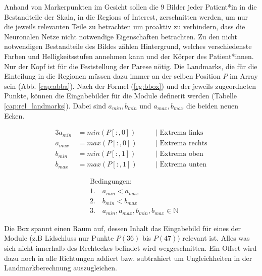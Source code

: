 Anhand von Markerpunkten im Gesicht sollen die 9 Bilder jeder Patient*in in die Bestandteile der Skala, in die Regions of Interest, zerschnitten werden, um nur die jeweils relevanten Teile zu betrachten um proaktiv zu verhindern, dass die Neuronalen Netze nicht notwendige Eigenschaften betrachten. Zu den nicht notwendigen Bestandteile des Bildes zählen Hintergrund, welches verschiedenste Farben und Helligkeitsstufen annehmen kann und der Körper des Patient*innen. Nur der Kopf ist für die Feststellung der Parese nötig. Die Landmarks, die für die Einteilung in die Regionen müssen dazu immer an der selben Position $P$ im Array sein (Abb. \ref{cap:abba}). Nach der Formel (\ref{eg:bbox}) und der jeweils zugeordneten Punkte, können die Eingabebilder für die Module definerit werden (Tabelle \ref{cap:rel_landmarks}). Dabei sind $a_{min}, b_{min}$ und $a_{max}, b_{max}$ die beiden neuen Ecken.

\noindent\begin{minipage}{.5\linewidth}
\begin{alignat*}{3}
  a_{min} &= min(P[:, 0]) &\quad &\textrm{| Extrema links}\\
  a_{max} &= max(P[:, 0]) &\quad &\textrm{| Extrema rechts}\\
  b_{min} &= min(P[:, 1]) &\quad &\textrm{| Extrema oben}\\
  b_{max} &= max(P[:, 1]) &\quad &\textrm{| Extrema unten}
\end{alignat*}
\end{minipage}%
\begin{minipage}{.5\linewidth}
  \begin{equation}
  \begin{split}
    &\textrm{Bedingungen:}\\
    &\textrm{1.}\quad  a_{min} < a_{max}\\
    &\textrm{2.}\quad  b_{min} < b_{max}\\
    &\textrm{3.}\quad a_{min}, a_{max}, b_{min}, b_{max} \in \mathbb{N}
  \end{split}
  \label{eg:bbox}
  \end{equation}
\end{minipage}

\vspace{1cm}

Die Box spannt einen Raum auf, dessen Inhalt das Eingabebild für eines der Module (z.B Lidschluss nur Punkte $P(36)$ bis $P(47)$) relevant ist. Alles was sich nicht innerhalb des Rechteckes befindet wird weggeschnitten. Ein Offset wird dazu noch in alle Richtungen addiert bzw. subtrahiert um Ungleichheiten in der Landmarkberechnung auszugleichen.








